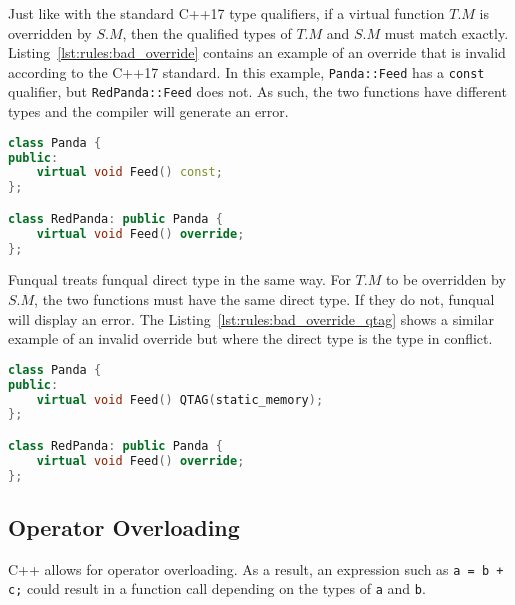 Just like with the standard C++17 type qualifiers, if a virtual function $T.M$ is overridden by $S.M$, then the qualified types of $T.M$ and $S.M$ must match exactly.  Listing~\ref{lst:rules:bad_override} contains an example of an override that is invalid according to the C++17 standard.  In this example, \lstinline{Panda::Feed} has a \lstinline{const} qualifier, but \lstinline{RedPanda::Feed} does not.  As such, the two functions have different types and the compiler will generate an error.  

\noindent\begin{minipage}[t]{\linewidth}
\begin{lstlisting}[language=C++,caption={Example C++ containing an error.  \lstinline{Panda::Feed} and \lstinline{RedPanda::Feed} have different types and so the override is invalid.},label={lst:rules:bad_override}]
class Panda {
public:
	virtual void Feed() const;
};

class RedPanda: public Panda {
	virtual void Feed() override;
};
\end{lstlisting}
\end{minipage}

Funqual treats funqual direct type in the same way.  For $T.M$ to be overridden by $S.M$, the two functions must have the same direct type.  If they do not, funqual will display an error.  The Listing~\ref{lst:rules:bad_override_qtag} shows a similar example of an invalid override but where the direct type is the type in conflict.

\noindent\begin{minipage}[t]{\linewidth}
\begin{lstlisting}[language=C++,
	caption={Example C++ containing a funqual type error.  \lstinline{Panda::Feed} and \lstinline{RedPanda::Feed} have different types and so the override is invalid.},
    label={lst:rules:bad_override_qtag}]
class Panda {
public:
	virtual void Feed() QTAG(static_memory);
};

class RedPanda: public Panda {
	virtual void Feed() override;
};
\end{lstlisting}
\end{minipage}

\subsection{Operator Overloading}

C++ allows for operator overloading.  As a result, an expression such as \mbox{\lstinline{a = b + c;}} could result in a function call depending on the types of \lstinline{a} and \lstinline{b}.  

